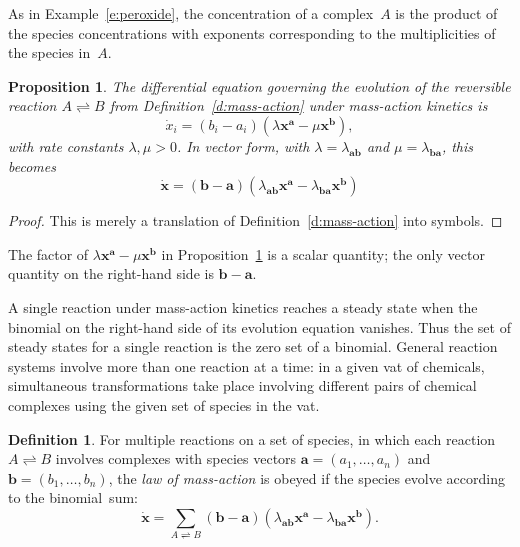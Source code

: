 \documentclass[12pt]{amsart}
\numberwithin{equation}{section}
\newtheorem{prop}[thm]{Proposition}
\theoremstyle{definition}
\newtheorem{defn}[thm]{Definition}
\begin{document}
As in Example~\ref{e:peroxide}, the concentration of a complex~$A$ is
the product of the species concentrations with exponents corresponding
to the multiplicities of the species in~$A$.

\begin{prop}\label{p:harpoons}
The differential equation governing the evolution of the reversible
reaction $A \rightleftharpoons B$ from Definition~\ref{d:mass-action}
under mass-action kinetics is
$$  \dot x_i = (b_i-a_i)(\lambda {\mathbf{x}}^{\mathbf{a}} - \mu {\mathbf{x}}^{\mathbf{b}}),
$$
with rate constants $\lambda, \mu > 0$.  In vector form, with $\lambda
= \lambda_{{\mathbf{a}}{\mathbf{b}}}$ and $\mu = \lambda_{{\mathbf{b}}{\mathbf{a}}}$, this becomes
$$  \dot{\mathbf{x}} = ({\mathbf{b}}-{\mathbf{a}})(\lambda_{{\mathbf{a}}{\mathbf{b}}}{\mathbf{x}}^{\mathbf{a}} - \lambda_{{\mathbf{b}}{\mathbf{a}}}{\mathbf{x}}^{\mathbf{b}})
$$
\end{prop}
\begin{proof}
This is merely a translation of Definition~\ref{d:mass-action} into
symbols.
\end{proof}

The factor of $\lambda {\mathbf{x}}^{\mathbf{a}} - \mu {\mathbf{x}}^{\mathbf{b}}$ in
Proposition~\ref{p:harpoons} is a scalar quantity; the only vector
quantity on the right-hand side is ${\mathbf{b}} - {\mathbf{a}}$.

A single reaction under mass-action kinetics reaches a steady state
when the binomial on the right-hand side of its evolution equation
vanishes.  Thus the set of steady states for a single reaction is the
zero set of a binomial.  General reaction systems involve more than
one reaction at a time: in a given vat of chemicals, simultaneous
transformations take place involving different pairs of chemical
complexes using the given set of species in the vat.

\begin{defn}\label{d:multiple}
For multiple reactions on a set of species, in which each reaction $A
\rightleftharpoons B$ involves complexes with species vectors ${\mathbf{a}} =
(a_1,\ldots,a_n)$ and~${\mathbf{b}} = (b_1,\ldots,b_n)$, the \emph{law of
mass-action} is obeyed if the species evolve according to the
binomial~sum:
$$  \dot{\mathbf{x}} = \sum_{A \rightleftharpoons B}
  ({\mathbf{b}}-{\mathbf{a}})(\lambda_{{\mathbf{a}}{\mathbf{b}}}{\mathbf{x}}^{\mathbf{a}} - \lambda_{{\mathbf{b}}{\mathbf{a}}}{\mathbf{x}}^{\mathbf{b}}).
$$
\end{defn}
\end{document}
